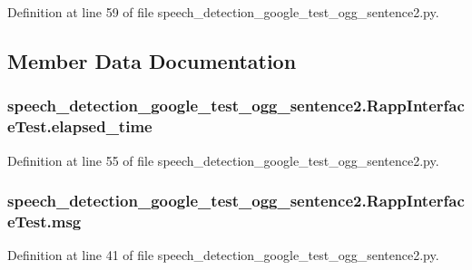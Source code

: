Definition at line 59 of file speech\-\_\-detection\-\_\-google\-\_\-test\-\_\-ogg\-\_\-sentence2.\-py.



\subsection{Member Data Documentation}
\hypertarget{classspeech__detection__google__test__ogg__sentence2_1_1RappInterfaceTest_a63e97f58cceb38c889d29b5ce14197f9}{
\subsubsection[{elapsed\-\_\-time}]{\setlength{\rightskip}{0pt plus 5cm}speech\-\_\-detection\-\_\-google\-\_\-test\-\_\-ogg\-\_\-sentence2.\-Rapp\-Interface\-Test.\-elapsed\-\_\-time}}\label{classspeech__detection__google__test__ogg__sentence2_1_1RappInterfaceTest_a63e97f58cceb38c889d29b5ce14197f9}


Definition at line 55 of file speech\-\_\-detection\-\_\-google\-\_\-test\-\_\-ogg\-\_\-sentence2.\-py.

\hypertarget{classspeech__detection__google__test__ogg__sentence2_1_1RappInterfaceTest_a95b8a8c95a2c91e6a27d02995f0a66ff}{
\subsubsection[{msg}]{\setlength{\rightskip}{0pt plus 5cm}speech\-\_\-detection\-\_\-google\-\_\-test\-\_\-ogg\-\_\-sentence2.\-Rapp\-Interface\-Test.\-msg}}\label{classspeech__detection__google__test__ogg__sentence2_1_1RappInterfaceTest_a95b8a8c95a2c91e6a27d02995f0a66ff}


Definition at line 41 of file speech\-\_\-detection\-\_\-google\-\_\-test\-\_\-ogg\-\_\-sentence2.\-py.


